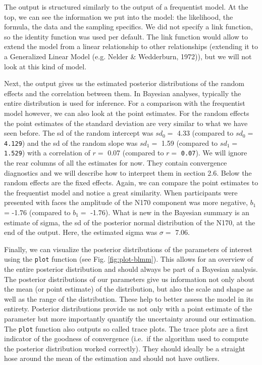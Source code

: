 \documentclass[
  doc,12pt,floatsintext]{apa7}
\begin{document}
\normalsize

The output is structured similarly to the output of a frequentist model. At the top, we can see the information we put into the model: the likelihood, the formula, the data and the sampling specifics. We did not specify a link function, so the identity function was used per default. The link function would allow to extend the model from a linear relationship to other relationships (extending it to a Generalized Linear Model (e.g. Nelder \& Wedderburn, 1972)), but we will not look at this kind of model.

Next, the output gives us the estimated posterior distributions of the random effects and the correlation between them. In Bayesian analyses, typically the entire distribution is used for inference. For a comparison with the frequentist model however, we can also look at the point estimates. For the random effects the point estimates of the standard deviation are very similar to what we have seen before. The sd of the random intercept was \(sd_0 =\) 4.33 (compared to \(sd_0 =\) \texttt{4.129}) and the sd of the random slope was \(sd_1 =\) 1.59 (compared to \(sd_1 =\) \texttt{1.529}) with a correlation of \(r =\) 0.07 (compared to \(r =\) \texttt{0.07}). We will ignore the rear columns of all the estimates for now. They contain convergence diagnostics and we will describe how to interpret them in section 2.6. Below the random effects are the fixed effects. Again, we can compare the point estimates to the frequentist model and notice a great similarity. When participants were presented with faces the amplitude of the N170 component was more negative, \(b_1\) = -1.76 (compared to \(b_1 =\) -1.76). What is new in the Bayesian summary is an estimate of sigma, the sd of the posterior normal distribution of the N170, at the end of the output. Here, the estimated sigma was \(\sigma =\) 7.06.

Finally, we can visualize the posterior distributions of the parameters of interest using the \texttt{plot} function (see Fig. \ref{fig:plot-blmm}). This allows for an overview of the entire posterior distribution and should always be part of a Bayesian analysis. The posterior distributions of our parameters give us information not only about the mean (or point estimate) of the distribution, but also the scale and shape as well as the range of the distribution. These help to better assess the model in its entirety. Posterior distributions provide us not only with a point estimate of the parameter but more importantly quantify the uncertainty around our estimation. The \texttt{plot} function also outputs so called trace plots. The trace plots are a first indicator of the goodness of convergence (i.e.~if the algorithm used to compute the posterior distribution worked correctly). They should ideally be a straight hose around the mean of the estimation and should not have outliers.
\end{document}
